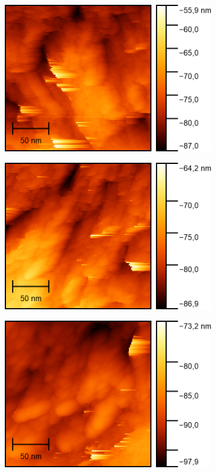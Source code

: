 \begin{figure}[H]
    \centering
    \begin{subfigure}{0.45\textwidth}
        \centering
        \includegraphics[width=\linewidth]{../figs/Gold10445}
        \caption{}
    \end{subfigure}
    \begin{subfigure}{0.45\textwidth}
        \centering
        \includegraphics[width=\linewidth]{../figs/Gold10446}
        \caption{}
    \end{subfigure}
    \begin{subfigure}{0.45\textwidth}
        \centering
        \includegraphics[width=\linewidth]{../figs/Gold10448}

\end{subfigure}
\end{figure}
